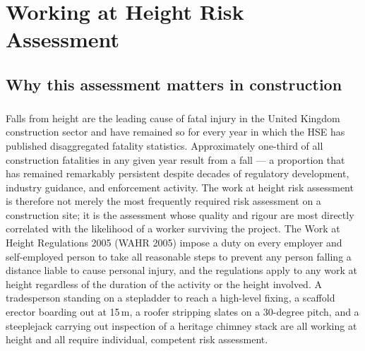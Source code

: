 \chapter{Working at Height Risk Assessment}
\label{chap:Working at Height Risk Assessment}

\section{Why this assessment matters in construction}

\paragraph{}
Falls from height are the leading cause of fatal injury in the United Kingdom construction sector and have remained so for every year in which the HSE has published disaggregated fatality statistics. Approximately one-third of all construction fatalities in any given year result from a fall --- a proportion that has remained remarkably persistent despite decades of regulatory development, industry guidance, and enforcement activity. The work at height risk assessment is therefore not merely the most frequently required risk assessment on a construction site; it is the assessment whose quality and rigour are most directly correlated with the likelihood of a worker surviving the project. The Work at Height Regulations 2005 (WAHR 2005) impose a duty on every employer and self-employed person to take all reasonable steps to prevent any person falling a distance liable to cause personal injury, and the regulations apply to any work at height regardless of the duration of the activity or the height involved. A tradesperson standing on a stepladder to reach a high-level fixing, a scaffold erector boarding out at 15\,m, a roofer stripping slates on a 30-degree pitch, and a steeplejack carrying out inspection of a heritage chimney stack are all working at height and all require individual, competent risk assessment.


